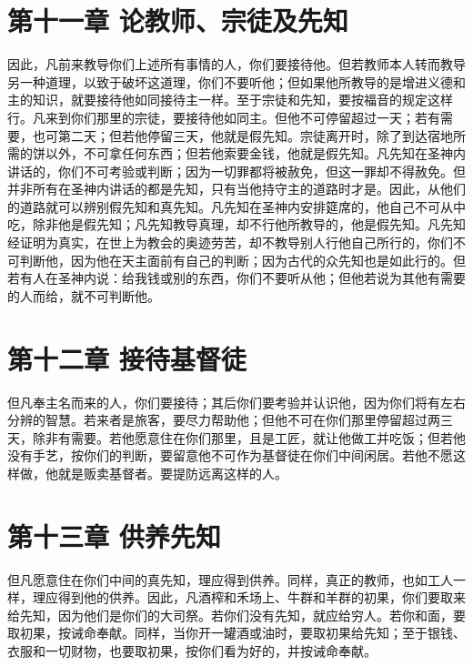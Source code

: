 
\section{第十一章 论教师、宗徒及先知}

因此，凡前来教导你们上述所有事情的人，你们要接待他。但若教师本人转而教导另一种道理，以致于破坏这道理，你们不要听他；但如果他所教导的是增进义德和主的知识，就要接待他如同接待主一样。至于宗徒和先知，要按福音的规定这样行。凡来到你们那里的宗徒，要接待他如同主。但他不可停留超过一天；若有需要，也可第二天；但若他停留三天，他就是假先知。宗徒离开时，除了到达宿地所需的饼以外，不可拿任何东西；但若他索要金钱，他就是假先知。凡先知在圣神内讲话的，你们不可考验或判断；因为一切罪都将被赦免，但这一罪却不得赦免。但并非所有在圣神内讲话的都是先知，只有当他持守主的道路时才是。因此，从他们的道路就可以辨别假先知和真先知。凡先知在圣神内安排筵席的，他自己不可从中吃，除非他是假先知；凡先知教导真理，却不行他所教导的，他是假先知。凡先知经证明为真实，在世上为教会的奥迹劳苦，却不教导别人行他自己所行的，你们不可判断他，因为他在天主面前有自己的判断；因为古代的众先知也是如此行的。但若有人在圣神内说：给我钱或别的东西，你们不要听从他；但他若说为其他有需要的人而给，就不可判断他。\par


\section{第十二章 接待基督徒}

但凡奉主名而来的人，你们要接待；其后你们要考验并认识他，因为你们将有左右分辨的智慧。若来者是旅客，要尽力帮助他；但他不可在你们那里停留超过两三天，除非有需要。若他愿意住在你们那里，且是工匠，就让他做工并吃饭；但若他没有手艺，按你们的判断，要留意他不可作为基督徒在你们中间闲居。若他不愿这样做，他就是贩卖基督者。要提防远离这样的人。\par


\section{第十三章 供养先知}

但凡愿意住在你们中间的真先知，理应得到供养。同样，真正的教师，也如工人一样，理应得到他的供养。因此，凡酒榨和禾场上、牛群和羊群的初果，你们要取来给先知，因为他们是你们的大司祭。若你们没有先知，就应给穷人。若你和面，要取初果，按诫命奉献。同样，当你开一罐酒或油时，要取初果给先知；至于银钱、衣服和一切财物，也要取初果，按你们看为好的，并按诫命奉献。\par


